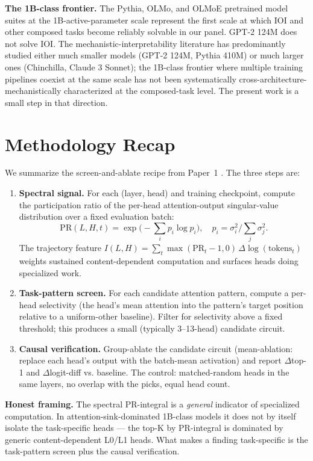 \documentclass[11pt]{article}
\begin{document}
\textbf{The 1B-class frontier.} The Pythia, OLMo, and OLMoE pretrained model suites at the 1B-active-parameter scale represent the first scale at which IOI and other composed tasks become reliably solvable in our panel. GPT-2 124M does not solve IOI. The mechanistic-interpretability literature has predominantly studied either much smaller models (GPT-2 124M, Pythia 410M) or much larger ones (Chinchilla, Claude 3 Sonnet); the 1B-class frontier where multiple training pipelines coexist at the same scale has not been systematically cross-architecture-mechanistically characterized at the composed-task level. The present work is a small step in that direction.

\section{Methodology Recap}
\label{sec:methods}

We summarize the screen-and-ablate recipe from Paper~1 \citep{paper1_methodology}. The three steps are:

\begin{enumerate}[topsep=2pt,itemsep=2pt]
\item \textbf{Spectral signal.} For each (layer, head) and training checkpoint, compute the participation ratio of the per-head attention-output singular-value distribution over a fixed evaluation batch:
\[
\mathrm{PR}(L,H,t) = \exp\!\big( -\textstyle\sum_i p_i \log p_i \big), \quad p_i = \sigma_i^2 / \textstyle\sum_j \sigma_j^2.
\]
The trajectory feature $I(L,H) = \sum_t \max(\mathrm{PR}_t - 1, 0)\,\Delta\log(\text{tokens}_t)$ weights sustained content-dependent computation and surfaces heads doing specialized work.
\item \textbf{Task-pattern screen.} For each candidate attention pattern, compute a per-head selectivity (the head's mean attention into the pattern's target position relative to a uniform-other baseline). Filter for selectivity above a fixed threshold; this produces a small (typically 3--13-head) candidate circuit.
\item \textbf{Causal verification.} Group-ablate the candidate circuit (mean-ablation: replace each head's output with the batch-mean activation) and report $\Delta$top-1 and $\Delta$logit-diff vs. baseline. The control: matched-random heads in the same layers, no overlap with the picks, equal head count.
\end{enumerate}

\textbf{Honest framing.} The spectral PR-integral is a \emph{general} indicator of specialized computation. In attention-sink-dominated 1B-class models it does not by itself isolate the task-specific heads --- the top-K by PR-integral is dominated by generic content-dependent L0/L1 heads. What makes a finding task-specific is the task-pattern screen plus the causal verification.
\end{document}
